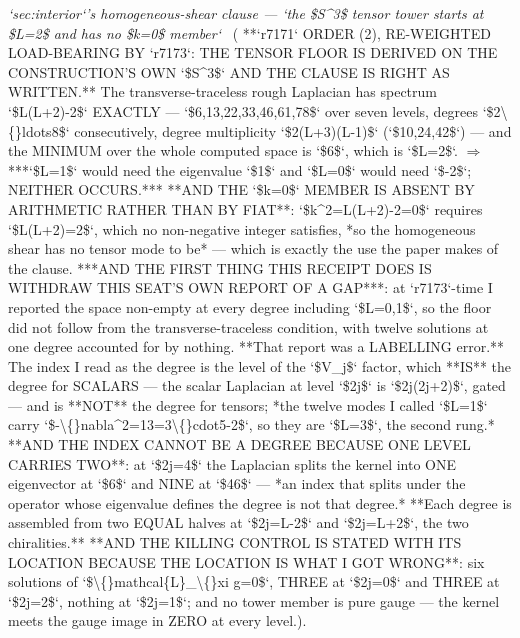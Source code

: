 \begin{description}
\textit{`sec:interior`'s homogeneous-shear clause --- `the \$S\textasciicircum{}3\$ tensor tower starts at \$L=2\$ and has no \$k=0\$ member`} \ ( **`r7171` ORDER (2), RE-WEIGHTED LOAD-BEARING BY `r7173`: THE TENSOR FLOOR IS DERIVED ON THE CONSTRUCTION'S OWN `\$S\textasciicircum{}3\$` AND THE CLAUSE IS RIGHT AS WRITTEN.** The transverse-traceless rough Laplacian has spectrum `\$L(L+2)-2\$` EXACTLY --- `\$6,13,22,33,46,61,78\$` over seven levels, degrees `\$2\textbackslash\{\}ldots8\$` consecutively, degree multiplicity `\$2(L+3)(L-1)\$` (`\$10,24,42\$`) --- and the MINIMUM over the whole computed space is `\$6\$`, which is `\$L=2\$`. \ensuremath{\Rightarrow} ***`\$L=1\$` would need the eigenvalue `\$1\$` and `\$L=0\$` would need `\$-2\$`; NEITHER OCCURS.***  **AND THE `\$k=0\$` MEMBER IS ABSENT BY ARITHMETIC RATHER THAN BY FIAT**: `\$k\textasciicircum{}2=L(L+2)-2=0\$` requires `\$L(L+2)=2\$`, which no non-negative integer satisfies, *so the homogeneous shear has no tensor mode to be* --- which is exactly the use the paper makes of the clause.  ***AND THE FIRST THING THIS RECEIPT DOES IS WITHDRAW THIS SEAT'S OWN REPORT OF A GAP***: at `r7173`-time I reported the space non-empty at every degree including `\$L=0,1\$`, so the floor did not follow from the transverse-traceless condition, with twelve solutions at one degree accounted for by nothing. **That report was a LABELLING error.** The index I read as the degree is the level of the `\$V\_j\$` factor, which **IS** the degree for SCALARS --- the scalar Laplacian at level `\$2j\$` is `\$2j(2j+2)\$`, gated --- and is **NOT** the degree for tensors; *the twelve modes I called `\$L=1\$` carry `\$-\textbackslash\{\}nabla\textasciicircum{}2=13=3\textbackslash\{\}cdot5-2\$`, so they are `\$L=3\$`, the second rung.*  **AND THE INDEX CANNOT BE A DEGREE BECAUSE ONE LEVEL CARRIES TWO**: at `\$2j=4\$` the Laplacian splits the kernel into ONE eigenvector at `\$6\$` and NINE at `\$46\$` --- *an index that splits under the operator whose eigenvalue defines the degree is not that degree.* **Each degree is assembled from two EQUAL halves at `\$2j=L-2\$` and `\$2j=L+2\$`, the two chiralities.**  **AND THE KILLING CONTROL IS STATED WITH ITS LOCATION BECAUSE THE LOCATION IS WHAT I GOT WRONG**: six solutions of `\$\textbackslash\{\}mathcal\{L\}\_\textbackslash\{\}xi g=0\$`, THREE at `\$2j=0\$` and THREE at `\$2j=2\$`, nothing at `\$2j=1\$`; and no tower member is pure gauge --- the kernel meets the gauge image in ZERO at every level.). 

\end{description}

